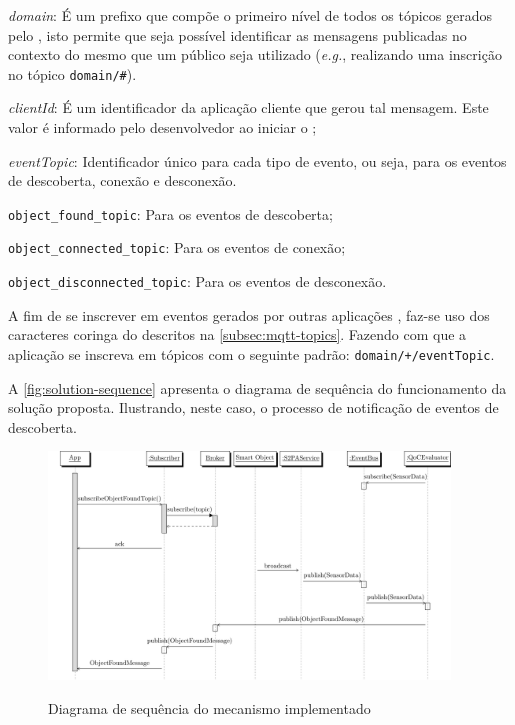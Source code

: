 \begin{alineas}
	\item \emph{domain}: É um prefixo que compõe o primeiro nível de todos os tópicos gerados pelo \cddl, isto permite que seja possível identificar as mensagens publicadas no contexto do \middleware mesmo que um \broker público seja utilizado (\textit{e.g.}, realizando uma inscrição no tópico \texttt{domain/\#}).

	\item \emph{clientId}: É um identificador da aplicação cliente que gerou tal mensagem. Este valor é informado pelo desenvolvedor ao iniciar o \cddl;

	\item \emph{eventTopic}: Identificador único para cada tipo de evento, ou seja, para os eventos de descoberta, conexão e desconexão.
	\begin{alineas}
		\item \texttt{object\_found\_topic}: Para os eventos de descoberta;
		\item \texttt{object\_connected\_topic}: Para os eventos de conexão;
		\item \texttt{object\_disconnected\_topic}: Para os eventos de desconexão.
	\end{alineas}
\end{alineas}


A fim de se inscrever em eventos gerados por outras aplicações \mhubcddl, faz-se uso dos caracteres coringa do \mqtt descritos na \autoref{subsec:mqtt-topics}. Fazendo com que a aplicação se inscreva em tópicos com o seguinte padrão: \texttt{domain/+/eventTopic}.


A \autoref{fig:solution-sequence} apresenta o diagrama de sequência do funcionamento da solução proposta. Ilustrando, neste caso, o processo de notificação de eventos de descoberta.

\begin{figure}[htb]
	\centering
	\caption{Diagrama de sequência do mecanismo implementado}
	\includegraphics[width=0.95\textwidth]{img/solution-sequence.pdf}
	\label{fig:solution-sequence}
\end{figure}

